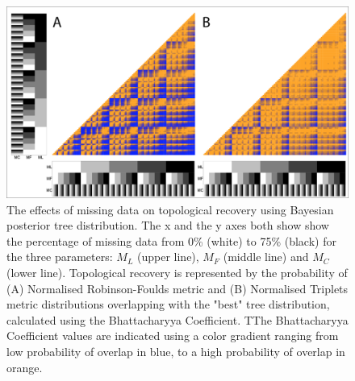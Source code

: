 \documentclass[12pt,letterpaper]{article}
\begin{document}
\begin{figure} 
\centering
    \includegraphics[width=1\textwidth]{SupplementaryFigures/PairwiseComp-Bayt-RF+Tr-colour.png} %
    \caption{The effects of missing data on topological recovery using Bayesian posterior tree distribution. The x and the y axes both show show the percentage of missing data from 0\% (white) to 75\% (black) for the three parameters: $M_{L}$ (upper line), $M_{F}$ (middle line) and $M_{C}$ (lower line). Topological recovery is represented by the probability of (A) Normalised Robinson-Foulds metric and (B) Normalised Triplets metric distributions overlapping with the "best" tree distribution, calculated using the Bhattacharyya Coefficient. TThe Bhattacharyya Coefficient values are indicated using a color gradient ranging from low probability of overlap in blue, to a high probability of overlap in orange.}
\label{Fig_Supp_paircomp_Bayt}
\end{figure} 
\end{document}
